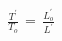 \documentclass[preview]{standalone}
\begin{document}
\begin{align*}
\frac{T^{'}}{T_{o}}\,=\,\frac{L^{'}_{o}}{L^{'}}
\end{align*}
\end{document}
